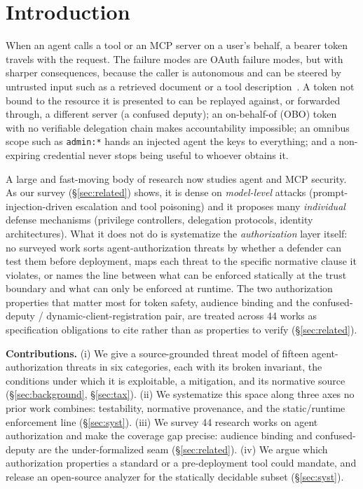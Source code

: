 \section{Introduction}
When an agent calls a tool or an MCP server on a user's behalf, a bearer token
travels with the request. The failure modes are OAuth failure modes, but with
sharper consequences, because the caller is autonomous and can be steered by
untrusted input such as a retrieved document or a tool description~\cite{agentauth2023indirectpi}.
A token not bound to the resource it is presented to can be replayed against, or
forwarded through, a different server (a confused deputy); an on-behalf-of (OBO)
token with no verifiable delegation chain makes accountability impossible; an
omnibus scope such as \texttt{admin:*} hands an injected agent the keys to
everything; and a non-expiring credential never stops being useful to whoever
obtains it.

A large and fast-moving body of research now studies agent and MCP security. As our
survey (\S\ref{sec:related}) shows, it is dense on \emph{model-level} attacks
(prompt-injection-driven escalation and tool poisoning) and it proposes many
\emph{individual} defense mechanisms (privilege controllers, delegation protocols,
identity architectures). What it does not do is systematize the \emph{authorization}
layer itself: no surveyed work sorts agent-authorization threats by whether a
defender can test them before deployment, maps each threat to the specific normative
clause it violates, or names the line between what can be enforced statically at the
trust boundary and what can only be enforced at runtime. The two authorization
properties that matter most for token safety, audience binding and the
confused-deputy / dynamic-client-registration pair, are treated across 44 works
as specification obligations to cite rather than as properties to verify
(\S\ref{sec:related}).

\noindent\textbf{Contributions.}
(i) We give a source-grounded threat model of fifteen agent-authorization threats in
six categories, each with its broken invariant, the conditions under which it is
exploitable, a mitigation, and its normative source (\S\ref{sec:background},
\S\ref{sec:tax}).
(ii) We systematize this space along three axes no prior work combines: testability,
normative provenance, and the static/runtime enforcement line (\S\ref{sec:syst}).
(iii) We survey 44 research works on agent authorization and make the coverage gap
precise: audience binding and confused-deputy are the under-formalized seam
(\S\ref{sec:related}).
(iv) We argue which authorization properties a standard or a pre-deployment tool
could mandate, and release an open-source analyzer for the statically decidable
subset (\S\ref{sec:syst}).

